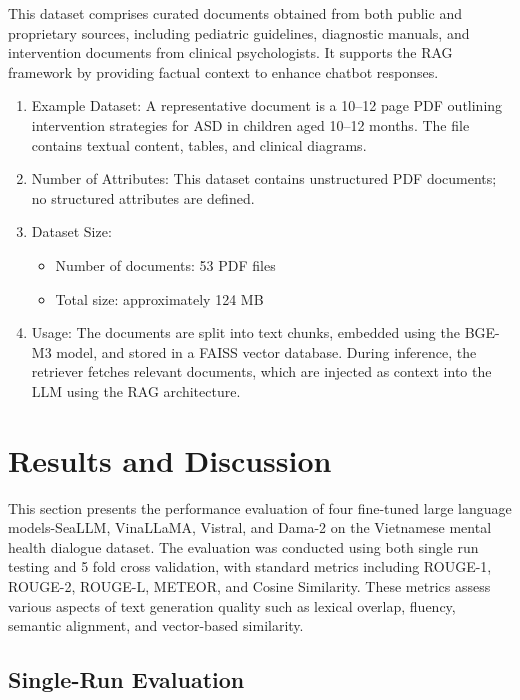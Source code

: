 \documentclass[conference]{IEEEtran}
\begin{document}
This dataset comprises curated documents obtained from both public and proprietary sources, including pediatric guidelines, diagnostic manuals, and intervention documents from clinical psychologists. It supports the RAG framework by providing factual context to enhance chatbot responses.
\begin{enumerate}[label=(\alph*)]
\item Example Dataset: 
A representative document is a 10–12 page PDF outlining intervention strategies for ASD in children aged 10–12 months. The file contains textual content, tables, and clinical diagrams.

\item Number of Attributes: 
This dataset contains unstructured PDF documents; no structured attributes are defined.

\item Dataset Size: 
\begin{itemize}
    \item Number of documents: 53 PDF files
    \item Total size: approximately 124 MB
\end{itemize}

\item Usage: 
The documents are split into text chunks, embedded using the BGE-M3 model, and stored in a FAISS vector database. During inference, the retriever fetches relevant documents, which are injected as context into the LLM using the RAG architecture.
\end{enumerate}

\section{Results and Discussion}
\label{sec:results-discussion}

This section presents the performance evaluation of four fine-tuned large language models-SeaLLM, VinaLLaMA, Vistral, and Dama-2 on the Vietnamese mental health dialogue dataset. The evaluation was conducted using both single run testing and 5 fold cross validation, with standard metrics including ROUGE-1, ROUGE-2, ROUGE-L, METEOR, and Cosine Similarity. These metrics assess various aspects of text generation quality such as lexical overlap, fluency, semantic alignment, and vector-based similarity.

\subsection{Single-Run Evaluation}
\end{document}
